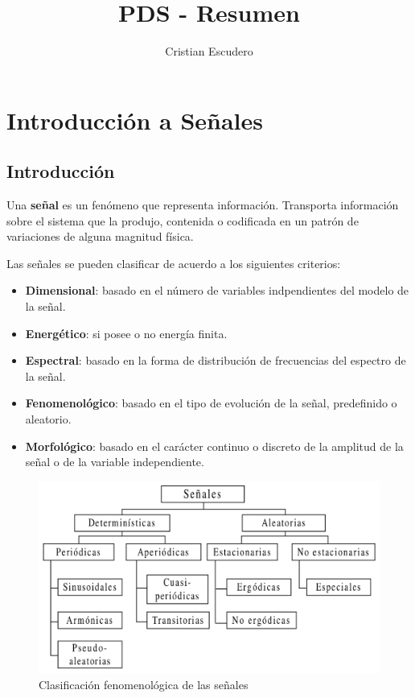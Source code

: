 \documentclass[10pt,a4paper]{book}
\author{Cristian Escudero}
\title{PDS - Resumen}
\begin{document}
\maketitle

\chapter{Introducción a Señales}
\section{Introducción}

Una \textbf{señal} es un fenómeno que representa información. Transporta información sobre el sistema que la produjo, contenida o codificada en un patrón de variaciones de alguna magnitud física. 

Las señales se pueden clasificar de acuerdo a los siguientes criterios:
\begin{itemize}
\item \textbf{Dimensional}: basado en el número de variables indpendientes del modelo de la señal.
\item \textbf{Energético}: si posee o no energía finita.
\item \textbf{Espectral}: basado en la forma de distribución de frecuencias del espectro de la señal.
\item \textbf{Fenomenológico}: basado en el tipo de evolución de la señal, predefinido o aleatorio.
\item \textbf{Morfológico}: basado en el carácter continuo o discreto de la amplitud de la señal o de la variable independiente.
\end{itemize}

\begin{figure}[h!]
  \caption{Clasificación fenomenológica de las señales}
  \label{fig:clasificacion_signals}
  \centering
  \hbox{\includegraphics[width=\textwidth-\fboxrule-\fboxrule]{fig1.png}}
\end{figure}
\end{document}
